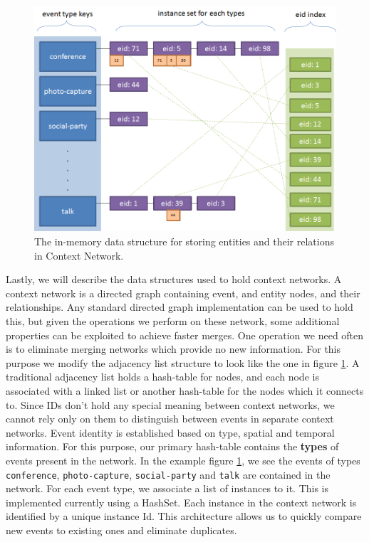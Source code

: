 \begin{figure}[h]
\centering
\includegraphics[width=\textwidth]{media/chapter4/adj-list.png}
\caption{The in-memory data structure for storing entities and their relations in Context Network.}
\label{fig:adj-list}
\end{figure}

Lastly, we will describe the data structures used to hold context networks. A context network is a directed graph containing event, and entity nodes, and their relationships. Any standard directed graph implementation can be used to hold this, but given the operations we perform on these network, some additional properties can be exploited to achieve faster merges. One operation we need often is to eliminate merging networks which provide no new information. For this purpose we modify the adjacency list structure to look like the one in figure \ref{fig:adj-list}. A traditional adjacency list holds a hash-table for nodes, and each node is associated with a linked list or another hash-table for the nodes which it connects to. Since IDs don't hold any special meaning between context networks, we cannot rely only on them to distinguish between events in separate context networks. Event identity is established based on type, spatial and temporal information. For this purpose, our primary hash-table contains the \textbf{types} of events present in the network. In the example figure \ref{fig:adj-list}, we see the events of types \texttt{conference}, \texttt{photo-capture}, \texttt{social-party} and \texttt{talk} are contained in the network. For each event type, we associate a list of instances to it. This is implemented currently using a HashSet. Each instance in the context network is identified by a unique instance Id. This architecture allows us to quickly compare new events to existing ones and eliminate duplicates. 

